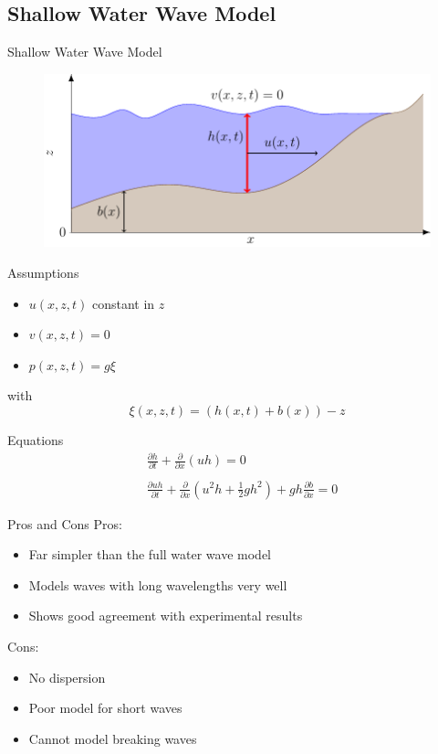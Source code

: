 \documentclass[pdf]{beamer}
\begin{document}
\subsection{Shallow Water Wave Model}
\begin{frame}{Shallow Water Wave Model}
	\begin{figure}
		\includegraphics[width=\textwidth]{./Pics/WaterModelDiagrams/SWWE.pdf}
	\end{figure}
\end{frame}
\begin{frame}{Assumptions}
	\begin{itemize}
		\item $u(x,z,t)$ constant in $z$
		\item $v(x,z,t) = 0$
		\item $p(x,z,t) = g \xi $
	\end{itemize}
	with 
	\[\xi(x,z,t) = \left(h(x,t) + b(x)\right) - z\]
\end{frame}
\begin{frame}{Equations}
	\begin{align*}
	&\frac{\partial h}{\partial t} + \frac{\partial }{\partial x}\left( uh\right) = 0 \\ \nonumber \\
	&\frac{\partial u h}{\partial t} + \frac{\partial }{\partial x}\left( u^2h + \frac{1}{2}gh^2\right) + gh\frac{\partial b}{\partial x} = 0
	\end{align*}
\end{frame}
\begin{frame}{Pros and Cons}
	Pros:
	\begin{itemize}
		\item Far simpler than the full water wave model
		\item Models waves with long wavelengths very well 
		\item Shows good agreement with experimental results
	\end{itemize}
	\pause
	Cons:
	\begin{itemize}
		\item No dispersion
		\item Poor model for short waves 
		\item Cannot model breaking waves
	\end{itemize}
\end{frame}
\end{document}
